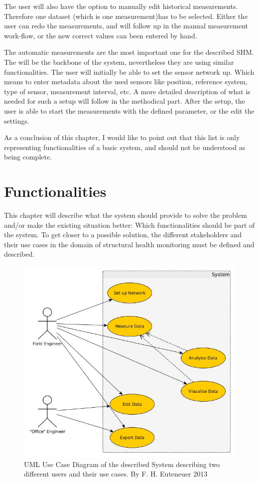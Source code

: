 The user will also have the option to manually edit historical measurements. Therefore one dataset (which is one measurement)has to be selected. Either the user can redo the measurements, and will follow up in the manual measurement work-flow, or the new correct values can been entered by hand.

The automatic measurements are the most important one for the described SHM. The will be the backbone of the system, nevertheless they are using similar functionalities. The user will initially be able to set the sensor network up. Which means to enter metadata about the used sensors like position, reference system, type of sensor, measurement interval, etc. A more detailed description of what is needed for such a setup will follow in the methodical part. After the setup, the user is able to start the measurements with the defined parameter, or the edit the settings.

As a conclusion of this chapter, I would like to point out that this list is only representing functionalities of a basic system, and should not be understood as being complete.


\section{Functionalities}
This chapter will describe what the system should provide to solve the problem and/or make the existing situation better: Which functionalities should be part of the system. To get closer to a possible solution, the different stakeholders and their use cases in the domain of structural health monitoring must be defined and described.

\begin{figure}[H]
	\centering
 	 \includegraphics[scale=0.6]{graphics/uml_functionalities.jpg} 
	\caption{UML Use Case Diagram of the described System describing two different users and their use cases. By F. H. Euteneuer 2013}
	 \label{fig:model_functionalities}
\end{figure}

